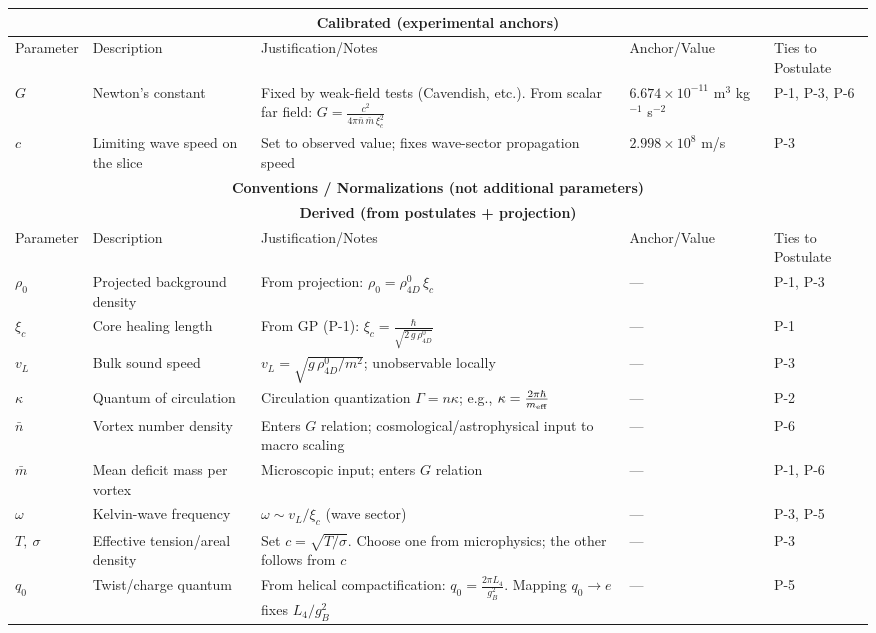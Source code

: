 \begin{table}[H]
\centering
\small
\begin{tabularx}{\linewidth}{|p{1.7cm}|p{3.2cm}|X|p{2.4cm}|p{2.1cm}|}
\hline
\multicolumn{5}{|c|}{\textbf{Calibrated (experimental anchors)}} \\
\hline
Parameter & Description & Justification/Notes & Anchor/Value & Ties to Postulate \\
\hline
$G$ & Newton's constant & Fixed by weak-field tests (Cavendish, etc.). From scalar far field: $G=\frac{c^2}{4\pi\bar n\,\bar m\,\xi_c^2}$ & $6.674\times10^{-11}$ m$^3$ kg$^{-1}$ s$^{-2}$ & P-1, P-3, P-6 \\
\hline
$c$ & Limiting wave speed on the slice & Set to observed value; fixes wave-sector propagation speed & $2.998\times10^{8}$ m/s & P-3 \\
\hline
\multicolumn{5}{|c|}{\textbf{Conventions / Normalizations (not additional parameters)}} \\
\hline
\multicolumn{5}{|c|}{\textbf{Derived (from postulates + projection)}} \\
\hline
Parameter & Description & Justification/Notes & Anchor/Value & Ties to Postulate \\
\hline
$\rho_0$ & Projected background density & From projection: $\rho_0=\rho_{4D}^0\,\xi_c$ & --- & P-1, P-3 \\
\hline
$\xi_c$ & Core healing length & From GP (P-1): $\xi_c=\frac{\hbar}{\sqrt{2\,g\,\rho_{4D}^0}}$ & --- & P-1 \\
\hline
$v_L$ & Bulk sound speed & $v_L=\sqrt{g\,\rho_{4D}^0/m^{2}}$; unobservable locally & --- & P-3 \\
\hline
$\kappa$ & Quantum of circulation & Circulation quantization $\Gamma=n\kappa$; e.g., $\kappa=\frac{2\pi\hbar}{m_{\rm eff}}$ & --- & P-2 \\
\hline
$\bar n$ & Vortex number density & Enters $G$ relation; cosmological/astrophysical input to macro scaling & --- & P-6 \\
\hline
$\bar m$ & Mean deficit mass per vortex & Microscopic input; enters $G$ relation & --- & P-1, P-6 \\
\hline
$\omega$ & Kelvin-wave frequency & $\omega\sim v_L/\xi_c$ (wave sector) & --- & P-3, P-5 \\
\hline
$T,\ \sigma$ & Effective tension/areal density & Set $c=\sqrt{T/\sigma}$. Choose one from microphysics; the other follows from $c$ & --- & P-3 \\
\hline
$q_0$ & Twist/charge quantum & From helical compactification: $q_0=\frac{2\pi L_4}{g_B^2}$. Mapping $q_0\to e$ fixes $L_4/g_B^2$ & --- & P-5 \\

\end{tabularx}
\end{table}
